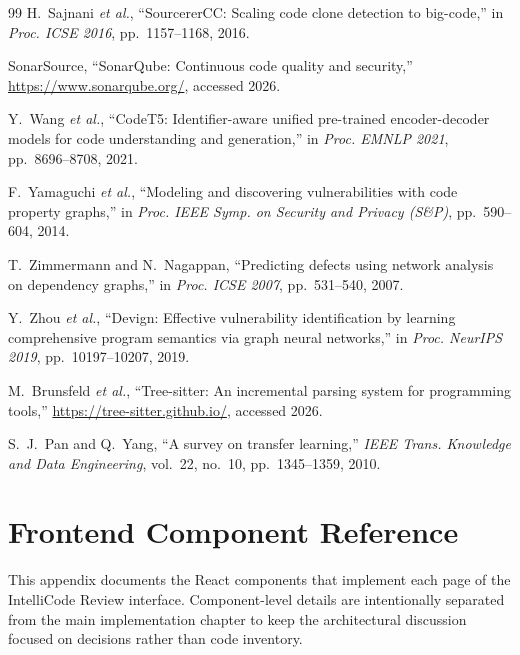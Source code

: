 \documentclass[12pt, oneside]{report}
\begin{document}
\begin{thebibliography}{99}
H.~Sajnani \textit{et al.},
``SourcererCC: Scaling code clone detection to big-code,''
in \textit{Proc. ICSE 2016}, pp.~1157--1168, 2016.

SonarSource,
``SonarQube: Continuous code quality and security,''
\url{https://www.sonarqube.org/}, accessed 2026.

Y.~Wang \textit{et al.},
``CodeT5: Identifier-aware unified pre-trained encoder-decoder models for code understanding
and generation,''
in \textit{Proc. EMNLP 2021}, pp.~8696--8708, 2021.

F.~Yamaguchi \textit{et al.},
``Modeling and discovering vulnerabilities with code property graphs,''
in \textit{Proc. IEEE Symp. on Security and Privacy (S\&P)}, pp.~590--604, 2014.

T.~Zimmermann and N.~Nagappan,
``Predicting defects using network analysis on dependency graphs,''
in \textit{Proc. ICSE 2007}, pp.~531--540, 2007.

Y.~Zhou \textit{et al.},
``Devign: Effective vulnerability identification by learning comprehensive program
semantics via graph neural networks,''
in \textit{Proc. NeurIPS 2019}, pp.~10197--10207, 2019.

M.~Brunsfeld \textit{et al.},
``Tree-sitter: An incremental parsing system for programming tools,''
\url{https://tree-sitter.github.io/}, accessed 2026.

S.~J.~Pan and Q.~Yang,
``A survey on transfer learning,''
\textit{IEEE Trans. Knowledge and Data Engineering}, vol.~22, no.~10, pp.~1345--1359, 2010.

\end{thebibliography}

\appendix

\chapter{Frontend Component Reference}
\label{app:frontend}

This appendix documents the React components that implement each page of the
IntelliCode Review interface. Component-level details are intentionally separated from
the main implementation chapter to keep the architectural discussion focused on
decisions rather than code inventory.
\end{document}
